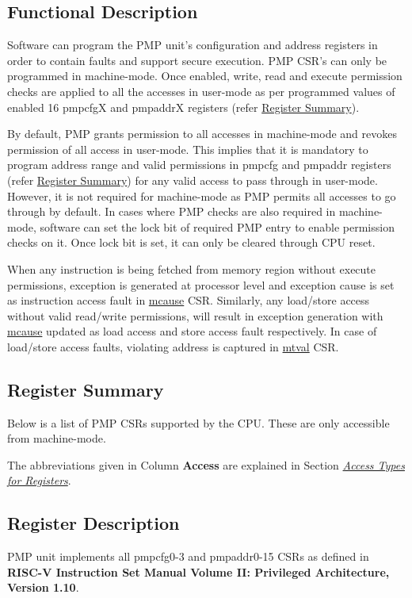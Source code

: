 \documentclass[main\_\_EN.tex]{subfiles}
\begin{document}
\subsection{Functional Description}
\label{sec:riscvcpu-pmp-func-descr}

Software can program the PMP unit's configuration and address registers in order to contain faults and support secure execution. PMP CSR's can only be programmed in machine-mode. Once enabled, write, read and execute permission checks are applied to all the accesses in user-mode as per programmed values of enabled 16 pmpcfgX and pmpaddrX registers (refer \hyperref[sec:riscvcpu-pmp-reg-summ]{Register Summary}).

By default, PMP grants permission to all accesses in machine-mode and revokes permission of all access in user-mode. This implies that it is mandatory to program address range and valid permissions in pmpcfg and pmpaddr registers (refer \hyperref[sec:riscvcpu-pmp-reg-summ]{Register Summary}) for any valid access to pass through in user-mode. However, it is not required for machine-mode as PMP permits all accesses to go through by default. In cases where PMP checks are also required in machine-mode, software can set the lock bit of required PMP entry to enable permission checks on it. Once lock bit is set, it can only be cleared through CPU reset.

When any instruction is being fetched from memory region without execute permissions, exception is generated at processor level and exception cause is set as instruction access fault in \hyperref[regdesc:MCAUSE]{mcause} CSR. Similarly, any load/store access without valid read/write permissions, will result in exception generation with \hyperref[regdesc:MCAUSE]{mcause} updated as load access and store access fault respectively. In case of load/store access faults, violating address is captured in \hyperref[regdesc:MTVAL]{mtval} CSR.


\clearpage
\hypertarget{riscvcpu-pmp-reg-summ}{}
\subsection{Register Summary}
\label{sec:riscvcpu-pmp-reg-summ}


Below is a list of PMP CSRs supported by the CPU. These are only accessible from machine-mode.

The abbreviations given in Column \textbf{Access} are explained in Section \hyperref[glossary-access-types]{\textit{Access Types for Registers}}.




\subsection{Register Description}
\label{sec:riscvcpu-pmp-reg-desc}

PMP unit implements all pmpcfg0-3 and pmpaddr0-15 CSRs as defined in \textbf{RISC-V Instruction Set Manual Volume II: Privileged Architecture, Version 1.10}.
\end{document}
